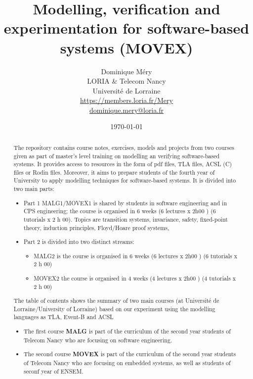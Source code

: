 \documentclass[ 12pt]{article}
\title{Modelling,  verification   and experimentation  for 
  software-based systems (MOVEX)}
\author{Dominique M\'ery\\
LORIA \& Telecom Nancy\\ Universit\'e de Lorraine\\
\url{https://members.loria.fr/Mery}\\ \url{dominique.mery@loria.fr}}
\date{\today}
\begin{document}
  \setcounter{ex}{1}
\maketitle
\begin{abstract}
The repository contains course notes, exercises, models and projects
from two  courses given as part of master's level training on
modelling an verifying software-based systems. It provides access to
resources in the form of pdf files, TLA files, ACSL (C)  files  or Rodin
files. Moreover, it aims to prepare  students of the fourth year of
University to apply modelling techniques  for software-based systems.
It is divided into  two  main  parts:
\begin{itemize}
\item Part 1  \textsf{MALG1/MOVEX1} is shared by students in software engineering and in
 CPS engineering; the course is organised  in 6 weeks (6 lectures x 
 2h00 ) (6 tutorials x 2 h 00). Topics are  transition systems,
 invariance, safety, fixed-point theory, induction principles,
 Floyd/Hoare proof systems, 
\item Part 2 is divided into  two distinct streams:
  \begin{itemize}
  \item \textsf{MALG2} is the course is organised  in 6 weeks (6 lectures x 
 2h00 ) (6 tutorials x 2 h 00)
  \item  \textsf{MOVEX2} the course is organised  in 4 weeks (4 lectures x 
 2h00 ) (4 tutorials x 2 h 00)
  \end{itemize}
\end{itemize}

The table
of contents shows the  summary of  two main courses (at Université de 
 Lorraine/University of Lorraine)  based on our
 experiment using the modelling languages as TLA,   Event-B  and ACSL
 
\begin{itemize}
\item The first course \textbf{MALG} is part of the curriculum of the
  second  year
  students of Telecom Nancy  who are  focusing on software
  engineering.
\item  The second course  \textbf{MOVEX}  is part of the curriculum of the
  second  year
  students of Telecom Nancy  who are  focusing on embedded systems, as
  well as students of seconf year of ENSEM. 
\end{itemize}

  
\end{abstract}
\end{document}
